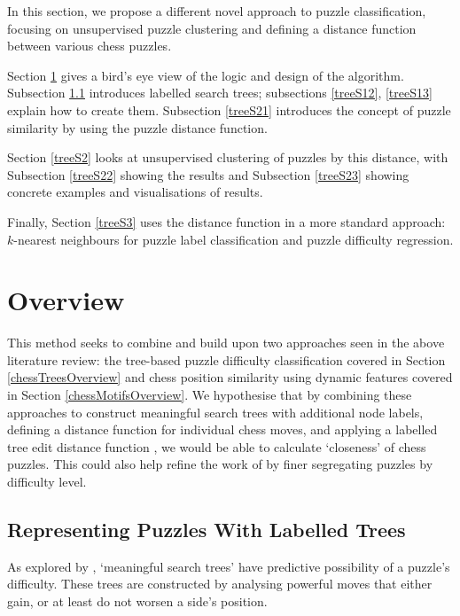 In this section, we propose a different novel approach to puzzle
classification, focusing on unsupervised puzzle clustering and defining a
distance function between various chess puzzles.

Section \ref{treeS1} gives a bird's eye view of the logic and design of the
algorithm. Subsection \ref{treeS11} introduces labelled search trees;
subsections \ref{treeS12}, \ref{treeS13} explain how to create them. Subsection
\ref{treeS21} introduces the concept of puzzle similarity by using the puzzle
distance function.

Section \ref{treeS2} looks at unsupervised clustering of puzzles by this
distance, with Subsection \ref{treeS22} showing the results and Subsection
\ref{treeS23} showing concrete examples and visualisations of results.

Finally, Section \ref{treeS3} uses the distance function in a more standard
approach: $k$-nearest neighbours for puzzle label classification and puzzle
difficulty regression.

\section{Overview}\label{treeS1}

This method seeks to combine and build upon two approaches seen in the above
literature review: the tree-based puzzle difficulty classification
\citep{chessTrees} covered in Section \ref{chessTreesOverview} and chess
position similarity using dynamic features \citep{chessMotifs} covered in
Section \ref{chessMotifsOverview}. We hypothesise that by combining these
approaches to construct meaningful search trees with additional node labels,
defining a distance function for individual chess moves, and applying a
labelled tree edit distance function \citep{editDistTrees}, we would be able to
calculate `closeness' of chess puzzles. This could also help refine the work of
\citet{chessTrees} by finer segregating puzzles by difficulty level.

\subsection{Representing Puzzles With Labelled Trees}\label{treeS11}

As explored by \citet{chessTrees}, `meaningful search trees' have predictive
possibility of a puzzle's difficulty. These trees are constructed by analysing
powerful moves that either gain, or at least do not worsen a side's position. 

